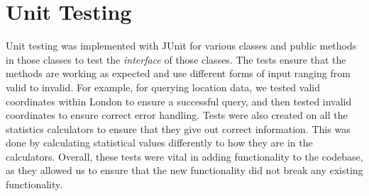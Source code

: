 \documentclass[../main.tex]{subfiles}
\begin{document}
\section{Unit Testing}

Unit testing was implemented with JUnit for various classes and public methods in those classes to test the \textit{interface} of those classes. The tests ensure that the methods are working as expected and use different forms of input ranging from valid to invalid. For example, for querying location data, we tested valid coordinates within London to ensure a successful query, and then tested invalid coordinates to ensure correct error handling. Tests were also created on all the statistics calculators to ensure that they give out correct information. This was done by calculating statistical values differently to how they are in the calculators. Overall, these tests were vital in adding functionality to the codebase, as they allowed us to ensure that the new functionality did not break any existing functionality.
\end{document}
